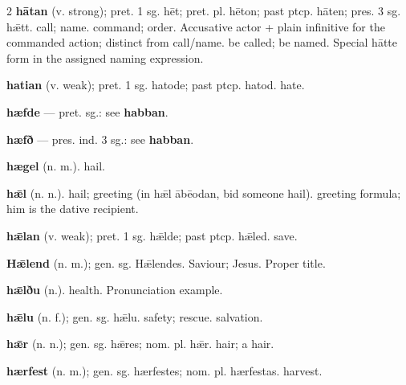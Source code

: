 \begin{multicols*}{2}
\textbf{hātan} (v. strong); pret. 1 sg. hēt; pret. pl. hēton; past ptcp. hāten; pres. 3 sg. hǣtt. call; name. command; order. Accusative actor + plain infinitive for the commanded action; distinct from call/name. be called; be named. Special hātte form in the assigned naming expression.\par
\textbf{hatian} (v. weak); pret. 1 sg. hatode; past ptcp. hatod. hate.\par
\textbf{hæfde} — pret. sg.: see \textbf{habban}.\par
\textbf{hæfð} — pres. ind. 3 sg.: see \textbf{habban}.\par
\textbf{hægel} (n. m.). hail.\par
\textbf{hǣl} (n. n.). hail; greeting (in hǣl ābēodan, bid someone hail). greeting formula; him is the dative recipient.\par
\textbf{hǣlan} (v. weak); pret. 1 sg. hǣlde; past ptcp. hǣled. save.\par
\textbf{Hǣlend} (n. m.); gen. sg. Hǣlendes. Saviour; Jesus. Proper title.\par
\textbf{hǣlðu} (n.). health. Pronunciation example.\par
\textbf{hǣlu} (n. f.); gen. sg. hǣlu. safety; rescue. salvation.\par
\textbf{hǣr} (n. n.); gen. sg. hǣres; nom. pl. hǣr. hair; a hair.\par
\textbf{hærfest} (n. m.); gen. sg. hærfestes; nom. pl. hærfestas. harvest.\par

\end{multicols*}
